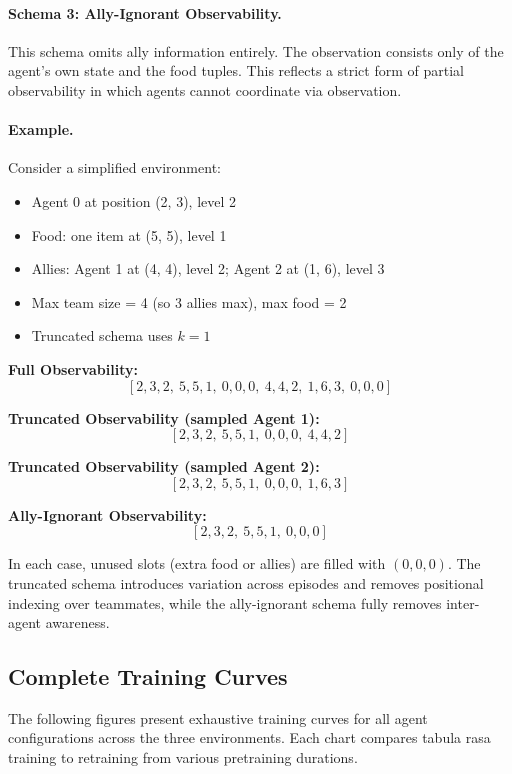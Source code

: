 \documentclass{article}
\begin{document}
\paragraph{Schema 3: Ally-Ignorant Observability.}
This schema omits ally information entirely. 
The observation consists only of the agent's own state and the food tuples. 
This reflects a strict form of partial observability in which agents cannot 
coordinate via observation.

\paragraph{Example.}
Consider a simplified environment:
\begin{itemize}
    \item Agent 0 at position (2, 3), level 2
    \item Food: one item at (5, 5), level 1
    \item Allies: Agent 1 at (4, 4), level 2; Agent 2 at (1, 6), level 3
    \item Max team size = 4 (so 3 allies max), max food = 2
    \item Truncated schema uses \(k = 1\)
\end{itemize}

\textbf{Full Observability:}
\[
[2, 3, 2,\ 5, 5, 1,\ 0, 0, 0,\ 4, 4, 2,\ 1, 6, 3,\ 0, 0, 0]
\]

\textbf{Truncated Observability (sampled Agent 1):}
\[
[2, 3, 2,\ 5, 5, 1,\ 0, 0, 0,\ 4, 4, 2]
\]

\textbf{Truncated Observability (sampled Agent 2):}
\[
[2, 3, 2,\ 5, 5, 1,\ 0, 0, 0,\ 1, 6, 3]
\]

\textbf{Ally-Ignorant Observability:}
\[
[2, 3, 2,\ 5, 5, 1,\ 0, 0, 0]
\]

\noindent In each case, unused slots (extra food or allies) are filled with \((0, 0, 0)\). 
The truncated schema introduces variation across episodes and removes positional 
indexing over teammates, while the ally-ignorant schema fully removes inter-agent awareness.

\clearpage

\subsection*{Complete Training Curves}
The following figures present exhaustive training curves for all 
agent configurations across the three environments. Each chart compares tabula rasa 
training to retraining from various pretraining durations.
\end{document}
